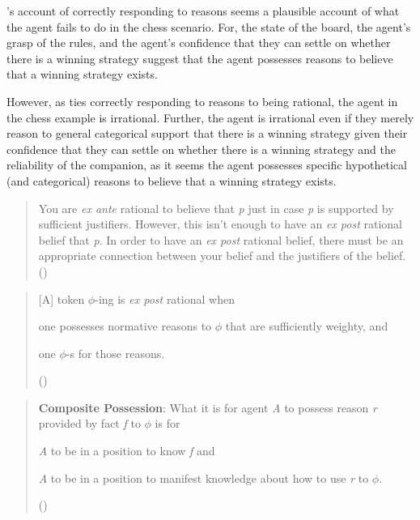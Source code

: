 \documentclass[10pt]{article}
\begin{document}
\begin{note}
  \citeauthor{Lord:2018aa}'s account of correctly responding to reasons seems a plausible account of what the agent fails to do in the chess scenario.
  For, the state of the board, the agent's grasp of the rules, and the agent's confidence that they can settle on whether there is a winning strategy suggest that the agent possesses reasons to believe that a winning strategy exists.

  However, as \citeauthor{Lord:2018aa} ties correctly responding to reasons to being rational, the agent in the chess example is irrational.
  Further, the agent is irrational even if they merely reason to general categorical support that there is a winning strategy given their confidence that they can settle on whether there is a winning strategy and the reliability of the companion, as it seems the agent possesses specific hypothetical (and categorical) reasons to believe that a winning strategy exists.
\end{note}

\begin{quote}
  You are \emph{ex ante} rational to believe that \emph{p} just in case \emph{p} is supported by sufficient justifiers.
  However, this isn't enough to have an \emph{ex post} rational belief that \emph{p}.
  In order to have an \emph{ex post} rational belief, there must be an appropriate connection between your belief and the justifiers of the belief.\nolinebreak
  \mbox{}\hfill\mbox{(\citeyear[70]{Lord:2018aa})}
\end{quote}

\begin{quote}
  [A] token \(\phi\)-ing is \emph{ex post} rational when
  \begin{enumerate*}[label=(\roman*), ref=\roman*.]
  \item one possesses normative reasons to \(\phi\) that are sufficiently weighty, and
  \item one \(\phi\)-s for those reasons.
  \end{enumerate*}
  \nolinebreak
  \mbox{}\hfill\mbox{(\citeyear[10]{Lord:2018aa})}
\end{quote}

\begin{quote}
  \textbf{Composite Possession}: What it is for agent \emph{A} to possess reason \emph{r} provided by fact \emph{f} to \(\phi\) is for
  \begin{enumerate*}[label=(\roman*), ref=\roman*.]
  \item\label{lord:posession:epistemic} \emph{A} to be in a position to know \emph{f} and
  \item\label{lord:posession:manifest} \emph{A} to be in a position to manifest knowledge about how to use \emph{r} to \(\phi\).
  \end{enumerate*}
  \nolinebreak
  \mbox{}\hfill\mbox{(\citeyear[123]{Lord:2018aa})}
\end{quote}
\end{document}
